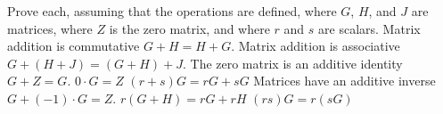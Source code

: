 
\begin{Exercise}[
name={},
title={}, 
difficulty=0,
origin={\cite{JH}}]
Prove each, assuming that the operations are defined, 
where \( G \), \( H \), and 
\( J \) are matrices, where
\( Z \) is the zero matrix, and where \( r \) and \( s \) are scalars.
\Question Matrix addition is commutative \( G+H=H+G \).
\Question Matrix addition is associative \( G+(H+J)=(G+H)+J \).\nolinebreak
\Question The zero matrix is an additive identity \( G+Z=G \).
\Question \( 0\cdot G=Z \)
\Question \( (r+s)G=rG+sG \)
\Question Matrices have an additive inverse \( G+(-1)\cdot G=Z \).
\Question \( r(G+H)=rG+rH \)
\Question \( (rs)G=r(sG) \)
\end{Exercise}

